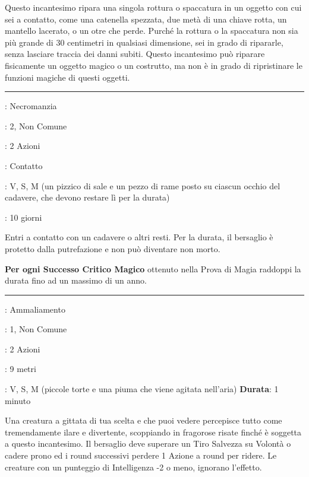 \begin{multicols}{2}
Questo incantesimo ripara una singola rottura o spaccatura in un oggetto con cui sei a contatto, come una catenella spezzata, due metà di una chiave rotta, un mantello lacerato, o un otre che perde. Purché la rottura o la spaccatura non sia più grande di 30 centimetri in qualsiasi dimensione, sei in grado di ripararle, senza lasciare traccia dei danni subiti. Questo incantesimo può riparare fisicamente un oggetto magico o un costrutto, ma non è in grado di ripristinare le funzioni magiche di questi oggetti.

\smallskip\noindent\rule{\linewidth}{2pt} \hypertarget{Riposo Inviolato}{}\medskip{}
\noindent
\begin{description}[noitemsep, topsep=0pt, parsep=0pt, partopsep=0pt, leftmargin=0cm, labelwidth=2.8cm]
	\item[\textbf{Lista di Magia}]: Necromanzia
	\item[\textbf{Livello}]: 2, Non Comune
	\item[\textbf{T. di Lancio}]: 2 Azioni
	\item[\textbf{Gittata}]: Contatto
	\item[\textbf{Componenti}]: V, S, M (un pizzico di sale e un pezzo di rame posto su ciascun occhio del cadavere, che devono restare lì per la durata)
	\item[\textbf{Durata}]: 10 giorni
\end{description}

Entri a contatto con un cadavere o altri resti. Per la durata, il bersaglio è protetto dalla putrefazione e non può diventare non morto.

\textbf{Per ogni Successo Critico Magico} ottenuto nella Prova di Magia raddoppi la durata fino ad un massimo di un anno.

\smallskip\noindent\rule{\linewidth}{2pt} \hypertarget{Risata Incontenibile}{}\medskip{}
\noindent
\begin{description}[noitemsep, topsep=0pt, parsep=0pt, partopsep=0pt, leftmargin=0cm, labelwidth=2.8cm]
	\item[\textbf{Lista di Magia}]: Ammaliamento
	\item[\textbf{Livello}]: 1, Non Comune
	\item[\textbf{T. di Lancio}]: 2 Azioni
	\item[\textbf{Gittata}]: 9 metri
	\item[\textbf{Componenti}]: V, S, M (piccole torte e una piuma che viene agitata nell'aria)
	\textbf{Durata}: 1 minuto
\end{description}
Una creatura a gittata di tua scelta e che puoi vedere percepisce tutto come tremendamente ilare e divertente, scoppiando in fragorose risate finché è soggetta a questo incantesimo. Il bersaglio deve superare un Tiro Salvezza su Volontà o cadere prono ed i round successivi perdere 1 Azione a round per ridere. Le creature con un punteggio di Intelligenza -2 o meno, ignorano l'effetto.


\end{multicols}
